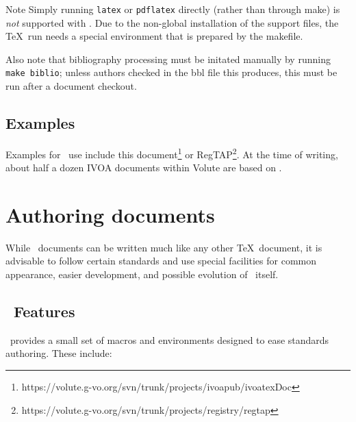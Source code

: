 \documentclass[11pt,a4paper]{ivoa}
\begin{document}
\begin{admonition}{Note}
Simply running \texttt{latex} or \texttt{pdflatex} directly
(rather than through make) is \emph{not} supported with \ivoatex.  Due
to the non-global installation of the support files, the \TeX\ run needs
a special environment that is prepared by the makefile.

Also note that bibliography processing must be initated manually by
running \texttt{make biblio}; unless authors checked in the bbl file
this produces, this must be run after a document checkout.
\end{admonition}

\subsection{Examples}

Examples for \ivoatex\ use include this 
document\footnote{https://volute.g-vo.org/svn/trunk/projects/ivoapub/ivoatexDoc}
or
RegTAP\footnote{https://volute.g-vo.org/svn/trunk/projects/registry/regtap}.
At the time of writing, about half a dozen IVOA documents within Volute
are based on \ivoatex.


\section{Authoring documents}
\label{sect:authoring}

While \ivoatex\ documents can be written much like any other \TeX\
document, it is advisable to follow certain standards and use special
facilities for common appearance, easier development, and possible
evolution of \ivoatex\ itself.

\subsection{\ivoatex\ Features}

\ivoatex\ provides a small set of macros and environments designed
to ease standards authoring.  These include:
\end{document}
